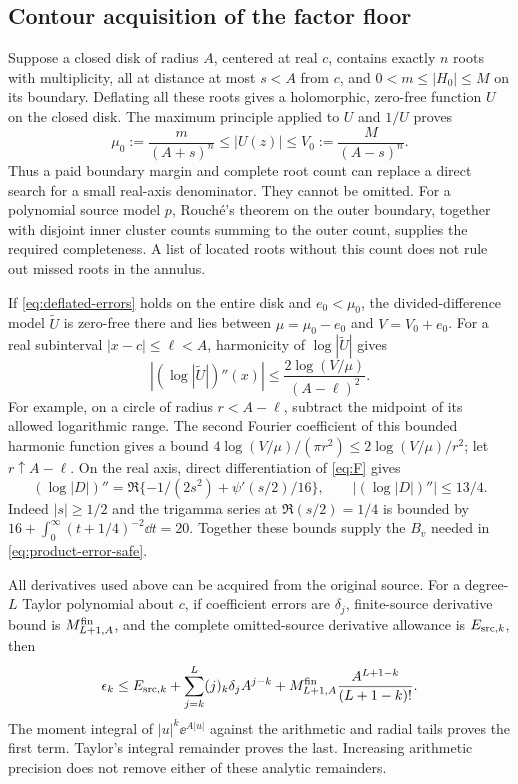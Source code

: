 \subsection{Contour acquisition of the factor floor}
Suppose a closed disk of radius \(A\), centered at real \(c\), contains
exactly \(n\) roots with multiplicity, all at distance at most \(s<A\)
from \(c\), and
\(0<m\le|H_0|\le M\) on its boundary. Deflating all these roots gives
a holomorphic, zero-free function \(U\) on the closed disk. The maximum
principle applied to \(U\) and \(1/U\) proves
\begin{equation}\label{eq:contour-factor-floor}
 \mu_0:=\frac{m}{(A+s)^n}\le|U(z)|\le
 V_0:=\frac{M}{(A-s)^n}.
\end{equation}
Thus a paid boundary margin and complete root count can replace a
direct search for a small real-axis denominator. They cannot be omitted.
For a polynomial source model \(p\), Rouch\'e's theorem on the outer
boundary, together with disjoint inner cluster counts summing to the
outer count, supplies the required completeness. A list of located
roots without this count does not rule out missed roots in the annulus.

If \eqref{eq:deflated-errors} holds on the entire disk and
\(e_0<\mu_0\), the divided-difference model \(\widetilde U\) is zero-free
there and lies between \(\mu=\mu_0-e_0\) and \(V=V_0+e_0\).
For a real subinterval \(|x-c|\le\ell<A\), harmonicity of
\(\log|\widetilde U|\) gives
\begin{equation}\label{eq:factor-curvature}
 |(\log|\widetilde U|)''(x)|
 \le\frac{2\log(V/\mu)}{(A-\ell)^2}.
\end{equation}
For example, on a circle of radius \(r<A-\ell\), subtract the midpoint
of its allowed logarithmic range. The second Fourier coefficient of
this bounded harmonic function gives a bound
\(4\log(V/\mu)/(\pi r^2)\le2\log(V/\mu)/r^2\); let \(r\uparrow A-\ell\).
On the real axis, direct differentiation of \eqref{eq:F} gives
\[
 (\log|D|)''=\Re\{-1/(2s^2)+\psi'(s/2)/16\},\qquad
 |(\log|D|)''|\le13/4.
\]
Indeed \(|s|\ge1/2\) and the trigamma series at \(\Re(s/2)=1/4\)
is bounded by \(16+\int_0^\infty(t+1/4)^{-2}\dd t=20\).
Together these bounds supply the \(B_v\) needed in
\eqref{eq:product-error-safe}.

All derivatives used above can be acquired from the original source.
For a degree-\(L\) Taylor polynomial about \(c\), if coefficient
errors are \(\delta_j\), finite-source derivative bound is
\(M_{L+1,A}^{\rm fin}\), and the complete omitted-source derivative
allowance is \(E_{{\rm src},k}\), then
\begin{equation}\label{eq:taylor-source-error}
 \epsilon_k\le E_{{\rm src},k}
 +\sum_{j=k}^L(j)_k\delta_jA^{j-k}
 +M_{L+1,A}^{\rm fin}\frac{A^{L+1-k}}{(L+1-k)!}.
\end{equation}
The moment integral of \(|u|^k\ee^{A|u|}\) against the arithmetic and
radial tails proves the first term. Taylor's integral remainder proves
the last. Increasing arithmetic precision does not remove either of
these analytic remainders.

